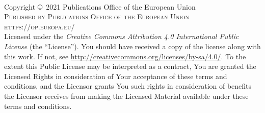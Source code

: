 \documentclass[11pt,fleqn]{book} %
\begin{document}

    \begingroup
    \thispagestyle{empty} %
    \vfill
    \endgroup


    \newpage
    ~\vfill
    \thispagestyle{empty}

    \noindent Copyright \copyright\ 2021 Publications Office of the European Union\\ %

    \noindent \textsc{Published by Publications Office of the European Union}\\ %

    \noindent \textsc{https://op.europa.eu/}\\ %

    \noindent Licensed under the \textit{Creative Commons Attribution 4.0 International Public License} (the ``License''). You should have received a copy of the license along with this work. If not, see \url{http://creativecommons.org/licenses/by-sa/4.0/}.
    To the extent this Public License may be interpreted as a contract, You are granted the Licensed Rights in consideration of Your acceptance of these terms and conditions, and the Licensor grants You such rights in consideration of benefits the Licensor receives from making the Licensed Material available under these terms and conditions.
\end{document}
